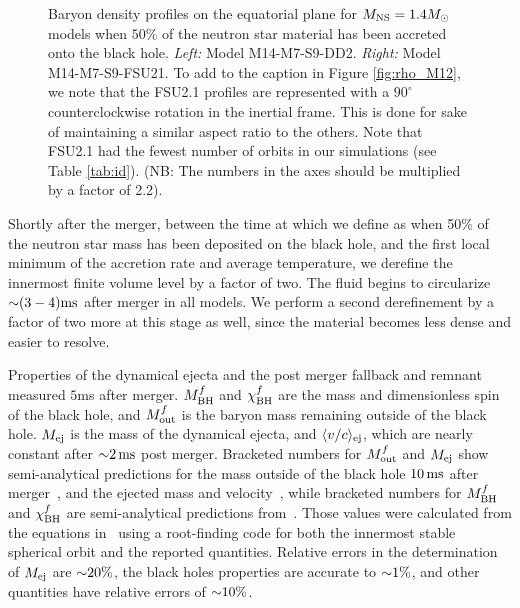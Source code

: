 \begin{figure}
\begin{subfigure}[b]{0.475\textwidth}
		\label{fig:rho_M14_FSU21}
		\centering
	\end{subfigure}
	\caption[Density profiles on equatorial plane for $1.4 M_{\odot}$ models]{
	Baryon density profiles on the equatorial plane for $M_{\rm NS} = 1.4 M_{\odot}$ models when $50\%$ of the neutron star material has been accreted onto the black hole.
	\textit{Left:} Model M14-M7-S9-DD2.
	\textit{Right:} Model M14-M7-S9-FSU21.
	To add to the caption in Figure \ref{fig:rho_M12}, we note that the FSU2.1 profiles are represented with a $90^{\circ}$ counterclockwise rotation in the inertial frame.  This is done for sake of maintaining a similar aspect ratio to the others.  Note that FSU2.1 had the fewest number of orbits in our simulations (see Table \ref{tab:id}). (NB: The numbers in the axes should be multiplied by a factor of 2.2). 
	}
	\label{fig:rho_M14}
\end{figure}

Shortly after the merger, between the time at which we define as when 50\% of the neutron star mass has been deposited on the black hole, and the first local minimum of the accretion rate and average temperature, we derefine the innermost finite volume level by a factor of two.
The fluid begins to circularize $\mathord{\sim} (3-4) {\rm ms}$ after merger in all models.
We perform a second derefinement by a factor of two more at 
this stage as well, since the material becomes less dense and easier to resolve.



\begin{table}
	\begin{center}
		\caption[Properties of the dynamical ejecta and post merger remnant]{
			Properties of the dynamical ejecta and the post merger fallback and remnant measured $5$ms after merger. 
			$M_{\rm BH}^f$ and  $\chi_{\rm BH}^f$  are the mass and dimensionless spin of the black hole,
			and $M_{\rm out}^f$ is the baryon mass remaining outside of the black hole.
			$M_{\rm ej}$ is the mass of the dynamical ejecta, and $\langle v/c\rangle_{\rm ej}$, which are nearly constant after $\mathord{\sim} 2\,{\rm ms}$ post merger. 
			Bracketed numbers for
			$M_{\rm out}^f$ and $M_{\rm ej}$ show semi-analytical predictions for the mass outside of the black hole $10\,{\rm ms}$ after merger~\cite{Foucart2012},
			and the ejected mass and velocity~\cite{Kawaguchi:2016}, while bracketed numbers for $M_{\rm BH}^f$ and $\chi_{\rm BH}^f$ are semi-analytical predictions
			from~\cite{pannarale2013black,Pannarale:2014}. Those values were calculated from the equations in~\cite{Pannarale:2014} using a root-finding code for both the innermost stable spherical orbit and the reported quantities.  Relative errors in the determination of $M_{\rm ej}$ are $\mathord{\sim} 20\%$, the black holes properties are
			accurate to $\mathord{\sim} 1\%$, and other quantities have relative errors of $\mathord{\sim} 10\%$.
		}
		\label{tab:results}
		{
			
		}
	\end{center}
\end{table}



